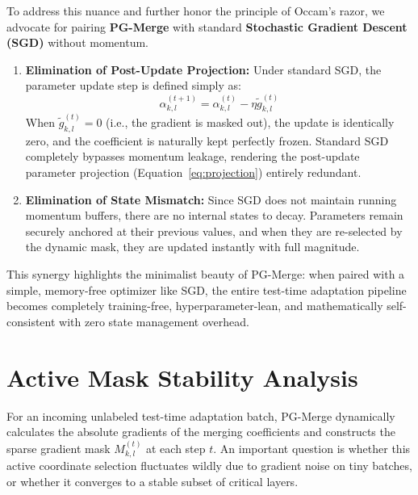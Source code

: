 \documentclass{article}
\theoremstyle{plain}
\theoremstyle{definition}
\theoremstyle{remark}
\begin{document}
To address this nuance and further honor the principle of Occam's razor, we advocate for pairing \textbf{PG-Merge} with standard \textbf{Stochastic Gradient Descent (SGD)} without momentum. 
\begin{enumerate}
    \item \textbf{Elimination of Post-Update Projection:} Under standard SGD, the parameter update step is defined simply as:
    \begin{equation}
        \alpha_{k, l}^{(t+1)} = \alpha_{k, l}^{(t)} - \eta \tilde{g}_{k, l}^{(t)}
    \end{equation}
    When $\tilde{g}_{k, l}^{(t)} = 0$ (i.e., the gradient is masked out), the update is identically zero, and the coefficient is naturally kept perfectly frozen. Standard SGD completely bypasses momentum leakage, rendering the post-update parameter projection (Equation~\ref{eq:projection}) entirely redundant.
    \item \textbf{Elimination of State Mismatch:} Since SGD does not maintain running momentum buffers, there are no internal states to decay. Parameters remain securely anchored at their previous values, and when they are re-selected by the dynamic mask, they are updated instantly with full magnitude.
\end{enumerate}
This synergy highlights the minimalist beauty of PG-Merge: when paired with a simple, memory-free optimizer like SGD, the entire test-time adaptation pipeline becomes completely training-free, hyperparameter-lean, and mathematically self-consistent with zero state management overhead.

\section{Active Mask Stability Analysis}
\label{app:mask_stability}

For an incoming unlabeled test-time adaptation batch, PG-Merge dynamically calculates the absolute gradients of the merging coefficients and constructs the sparse gradient mask $M_{k, l}^{(t)}$ at each step $t$. An important question is whether this active coordinate selection fluctuates wildly due to gradient noise on tiny batches, or whether it converges to a stable subset of critical layers.
\end{document}
